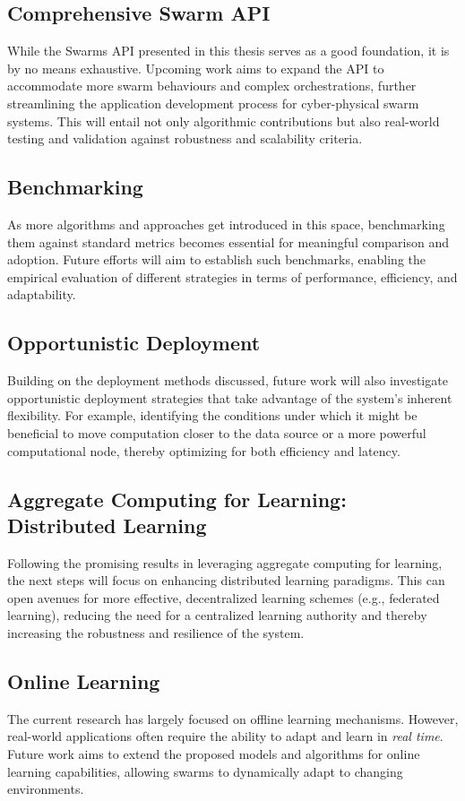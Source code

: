 \subsection*{Comprehensive Swarm API}
While the Swarms API presented in this thesis serves as a good foundation, it is by no means exhaustive. 
 Upcoming work aims to expand the API to accommodate more swarm behaviours and complex orchestrations, 
 further streamlining the application development process for cyber-physical swarm systems. 
 This will entail not only algorithmic contributions but also real-world testing and validation against robustness and scalability criteria.

\subsection*{Benchmarking}
As more algorithms and approaches get introduced in this space, 
 benchmarking them against standard metrics becomes essential for meaningful comparison and adoption.
% 
Future efforts will aim to establish such benchmarks, 
 enabling the empirical evaluation of different strategies in terms of performance, efficiency, and adaptability.

\subsection*{Opportunistic Deployment}
Building on the deployment methods discussed,
 future work will also investigate opportunistic deployment strategies that take advantage of the system's inherent flexibility. 
 For example, 
  identifying the conditions under which it might be beneficial to move computation closer to the data source or a more powerful computational node, 
  thereby optimizing for both efficiency and latency.

\subsection*{Aggregate Computing for Learning: Distributed Learning}
Following the promising results in leveraging aggregate computing for learning, 
 the next steps will focus on enhancing distributed learning paradigms. 
 This can open avenues for more effective, decentralized learning schemes (e.g., federated learning), 
 reducing the need for a centralized learning authority and thereby increasing the robustness and resilience of the system.

\subsection*{Online Learning}
The current research has largely focused on offline learning mechanisms. 
 However, real-world applications often require the ability to adapt and learn in \emph{real time}. 
 Future work aims to extend the proposed models and algorithms for online learning capabilities, 
 allowing swarms to dynamically adapt to changing environments.

